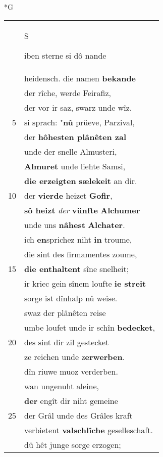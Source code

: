 \documentclass[8pt,a4paper,notitlepage]{article}
\begin{document}
\begin{table}[ht]
\begin{minipage}[t]{0.5\linewidth}
\small
\begin{center}*G
\end{center}
\begin{tabular}{rl}
 & \begin{large}S\end{large}iben sterne si dô nande\\ 
 & heidensch. die namen \textbf{bekande}\\ 
 & der rîche, werde Feirafiz,\\ 
 & der vor ir saz, swarz unde wîz.\\ 
5 & si sprach: "\textbf{nû} prüeve, Parzival,\\ 
 & der \textbf{hôhesten plânêten zal}\\ 
 & unde der snelle Almusteri,\\ 
 & \textbf{Almuret} unde liehte Samsi,\\ 
 & \textbf{die erzeigten} \textbf{sælekeit} an dir.\\ 
10 & der \textbf{vierde} heizet \textbf{Gofir},\\ 
 & \textbf{sô heizt} \textit{der} \textbf{vünfte} \textbf{Alchumer}\\ 
 & unde uns \textbf{nâhest} \textbf{Alchater}.\\ 
 & ich \textbf{en}sprichez niht \textbf{in} troume,\\ 
 & die sint des firmamentes zoume,\\ 
15 & \textbf{die enthaltent} sîne snelheit;\\ 
 & ir kriec gein sînem loufte \textbf{ie streit}\\ 
 & sorge ist dînhalp nû weise.\\ 
 & swaz der plânêten reise\\ 
 & umbe loufet unde ir schîn \textbf{bedecket},\\ 
20 & des sint dir zil gestecket\\ 
 & ze reichen unde z\textbf{erwerben}.\\ 
 & dîn riuwe muoz verderben.\\ 
 & wan ungenuht aleine,\\ 
 & \textbf{der} engît dir niht gemeine\\ 
25 & der Grâl unde des Grâles kraft\\ 
 & verbietent \textbf{valschlîche} geselleschaft.\\ 
 & dû hêt junge sorge erzogen;\\ 

\end{tabular}
\end{minipage}
\end{table}
\end{document}
